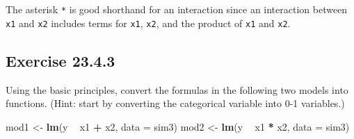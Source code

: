 \documentclass[]{book}
\newenvironment{Shaded}{\begin{snugshade}}{\end{snugshade}}
\newcommand{\ControlFlowTok}[1]{\textcolor[rgb]{0.13,0.29,0.53}{\textbf{#1}}}
\newcommand{\DataTypeTok}[1]{\textcolor[rgb]{0.13,0.29,0.53}{#1}}
\newcommand{\KeywordTok}[1]{\textcolor[rgb]{0.13,0.29,0.53}{\textbf{#1}}}
\newcommand{\NormalTok}[1]{#1}
\newcommand{\OperatorTok}[1]{\textcolor[rgb]{0.81,0.36,0.00}{\textbf{#1}}}
\newcommand{\StringTok}[1]{\textcolor[rgb]{0.31,0.60,0.02}{#1}}
\theoremstyle{plain}
\theoremstyle{remark}
\begin{document}
The asterisk \texttt{*} is good shorthand for an interaction since an
interaction between \texttt{x1} and \texttt{x2} includes terms for
\texttt{x1}, \texttt{x2}, and the product of \texttt{x1} and
\texttt{x2}.

\hypertarget{exercise-23.4.3}{%
\subsection*{\texorpdfstring{Exercise
{23.4.3}}{Exercise 23.4.3}}\label{exercise-23.4.3}}

Using the basic principles, convert the formulas in the following two
models into functions. (Hint: start by converting the categorical
variable into 0-1 variables.)

\begin{Shaded}
\begin{Highlighting}[]
\NormalTok{mod1 <-}\StringTok{ }\KeywordTok{lm}\NormalTok{(y }\OperatorTok{~}\StringTok{ }\NormalTok{x1 }\OperatorTok{+}\StringTok{ }\NormalTok{x2, }\DataTypeTok{data =}\NormalTok{ sim3)}
\NormalTok{mod2 <-}\StringTok{ }\KeywordTok{lm}\NormalTok{(y }\OperatorTok{~}\StringTok{ }\NormalTok{x1 }\OperatorTok{*}\StringTok{ }\NormalTok{x2, }\DataTypeTok{data =}\NormalTok{ sim3)}
\end{Highlighting}
\end{Shaded}

\begin{Shaded}
\end{Shaded}
\end{document}
